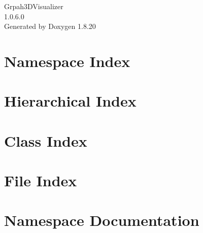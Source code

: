 \let\mypdfximage\pdfximage\def\pdfximage{\immediate\mypdfximage}\documentclass[twoside]{book}
\newcommand{\+}{\discretionary{\mbox{\scriptsize$\hookleftarrow$}}{}{}}
\newcommand{\clearemptydoublepage}{%
  \newpage{\pagestyle{empty}\cleardoublepage}%
}
\begin{document}
\hypersetup{pageanchor=false,
             bookmarksnumbered=true,
             pdfencoding=unicode
            }
\begin{titlepage}
\vspace*{7cm}
\begin{center}%
{\Large Grpah3\+D\+Visualizer \\[1ex]\large 1.\+0.\+6.\+0 }\\
\vspace*{1cm}
{\large Generated by Doxygen 1.8.20}\\
\end{center}
\end{titlepage}
\clearemptydoublepage
{}
\tableofcontents
\clearemptydoublepage
{}
\hypersetup{pageanchor=true}

\chapter{Namespace Index}

\chapter{Hierarchical Index}

\chapter{Class Index}

\chapter{File Index}

\chapter{Namespace Documentation}







\end{document}
